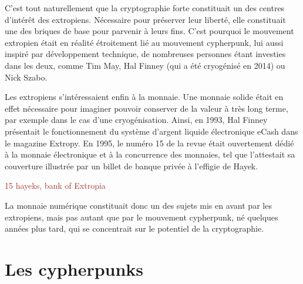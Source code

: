 C'est tout naturellement que la cryptographie forte constituait un des centres d'intérêt des extropiens. Nécessaire pour préserver leur liberté, elle constituait une des briques de base pour parvenir à leurs fins. C'est pourquoi le mouvement extropien était en réalité étroitement lié au mouvement cypherpunk, lui aussi inspiré par développement technique, de nombreuses personnes étant investies dans les deux, comme Tim May, Hal Finney (qui a été cryogénisé en 2014) ou Nick Szabo.

Les extropiens s'intéressaient enfin à la monnaie. Une monnaie solide était en effet nécessaire pour imaginer pouvoir conserver de la valeur à très long terme, par exemple dans le cas d'une cryogénisation. Ainsi, en 1993, Hal Finney présentait le fonctionnement du système d'argent liquide électronique eCash dans le magazine Extropy. En 1995, le numéro 15 de la revue était ouvertement dédié à la monnaie électronique et à la concurrence des monnaies, tel que l'attestait sa couverture illustrée par un billet de banque privée à l'effigie de Hayek.

\textcolor{brown}{15 hayeks, bank of Extropia}

La monnaie numérique constituait donc un des sujets mis en avant par les extropiens, mais pas autant que par le mouvement cypherpunk, né quelques années plus tard, qui se concentrait sur le potentiel de la cryptographie.


\section*{Les cypherpunks}

